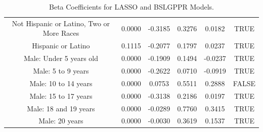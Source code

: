 \documentclass{article} %
\begin{document}
\begin{table}[H]
\begin{adjustbox}{width = \textwidth}
\begin{tabular}{cccccc}
  Not Hispanic or Latino, Two or More Races & 0.0000 & -0.3185 & 0.3276 & 0.0182 & TRUE \\ 
  Hispanic or Latino & 0.1115 & -0.2077 & 0.1797 & 0.0237 & TRUE \\ 
  Male: Under 5 years old & 0.0000 & -0.1909 & 0.1494 & -0.0237 & TRUE \\ 
  Male: 5 to 9 years & 0.0000 & -0.2622 & 0.0710 & -0.0919 & TRUE \\ 
  Male: 10 to 14 years & 0.0000 & 0.0753 & 0.5511 & 0.2888 & FALSE \\ 
  Male: 15 to 17 years & 0.0000 & -0.3138 & 0.2186 & 0.0197 & TRUE \\ 
  Male: 18 and 19 years & 0.0000 & -0.0289 & 0.7760 & 0.3415 & TRUE \\ 
  Male: 20 years & 0.0000 & -0.0030 & 0.3619 & 0.1537 & TRUE \\ 

    \hline
\end{tabular}

\end{adjustbox}
\caption{Beta Coefficients for LASSO and BSLGPPR Models.}
\label{table:betacoef}
\end{table}
\end{document}
